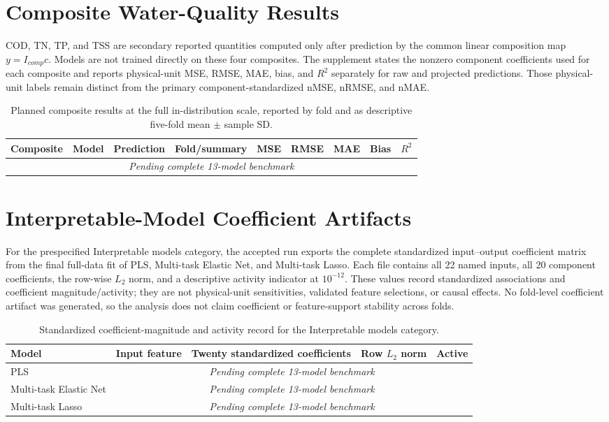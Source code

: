 \documentclass[a4paper,11pt]{article}
\newcommand{\pending}{\textit{Pending complete 13-model benchmark}}
\begin{document}
\section{Composite Water-Quality Results}

COD, TN, TP, and TSS are secondary reported quantities computed only after prediction by the common linear composition map $y=I_{comp}c$. Models are not trained directly on these four composites. The supplement states the nonzero component coefficients used for each composite and reports physical-unit MSE, RMSE, MAE, bias, and $R^2$ separately for raw and projected predictions. Those physical-unit labels remain distinct from the primary component-standardized nMSE, nRMSE, and nMAE.

\begin{table}[htbp]
\centering
\caption{Planned composite results at the full in-distribution scale, reported by fold and as descriptive five-fold mean $\pm$ sample SD.}
\label{tab:s_composite_results}
\scriptsize
\begin{tabular}{llllrrrrr}
\toprule
Composite & Model & Prediction & Fold/summary & MSE & RMSE & MAE & Bias & $R^2$ \\
\midrule
\multicolumn{9}{c}{\pending} \\
\bottomrule
\end{tabular}
\end{table}

\section{Interpretable-Model Coefficient Artifacts}

For the prespecified Interpretable models category, the accepted run exports the complete standardized input--output coefficient matrix from the final full-data fit of PLS, Multi-task Elastic Net, and Multi-task Lasso. Each file contains all 22 named inputs, all 20 component coefficients, the row-wise $L_2$ norm, and a descriptive activity indicator at $10^{-12}$. These values record standardized associations and coefficient magnitude/activity; they are not physical-unit sensitivities, validated feature selections, or causal effects. No fold-level coefficient artifact was generated, so the analysis does not claim coefficient or feature-support stability across folds.

\begin{table}[htbp]
\centering
\caption{Standardized coefficient-magnitude and activity record for the Interpretable models category.}
\label{tab:s_interpretable_coefficients}
\scriptsize
\begin{tabular}{lllll}
\toprule
Model & Input feature & Twenty standardized coefficients & Row $L_2$ norm & Active \\
\midrule
PLS & \multicolumn{4}{c}{\pending} \\
Multi-task Elastic Net & \multicolumn{4}{c}{\pending} \\
Multi-task Lasso & \multicolumn{4}{c}{\pending} \\
\bottomrule
\end{tabular}
\end{table}
\end{document}
